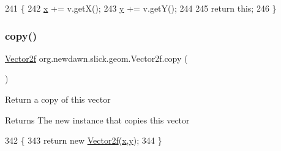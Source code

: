 \begin{DoxyCode}
241     \{
242         \mbox{\hyperlink{classorg_1_1newdawn_1_1slick_1_1geom_1_1_vector2f_a3c72cdf13ebc511a472e1a02002fa579}{x}} += v.getX(); 
243         \mbox{\hyperlink{classorg_1_1newdawn_1_1slick_1_1geom_1_1_vector2f_aa03914f0c3d32063aa90e5bd7b74688e}{y}} += v.getY();
244         
245         \textcolor{keywordflow}{return} \textcolor{keyword}{this};
246     \}
\end{DoxyCode}
\mbox{\label{classorg_1_1newdawn_1_1slick_1_1geom_1_1_vector2f_a3f38eacefe225aef76d800a07267db32}} 
\subsubsection{\texorpdfstring{copy()}{copy()}}
{\footnotesize\ttfamily \mbox{\hyperlink{classorg_1_1newdawn_1_1slick_1_1geom_1_1_vector2f}{Vector2f}} org.\+newdawn.\+slick.\+geom.\+Vector2f.\+copy (\begin{DoxyParamCaption}{ }\end{DoxyParamCaption})\hspace{0.3cm}{\ttfamily [inline]}}

Return a copy of this vector

\begin{DoxyReturn}{Returns}
The new instance that copies this vector 
\end{DoxyReturn}

\begin{DoxyCode}
342                            \{
343         \textcolor{keywordflow}{return} \textcolor{keyword}{new} \mbox{\hyperlink{classorg_1_1newdawn_1_1slick_1_1geom_1_1_vector2f_a3b8e9eda9c9203462324bf4bc8e42153}{Vector2f}}(\mbox{\hyperlink{classorg_1_1newdawn_1_1slick_1_1geom_1_1_vector2f_a3c72cdf13ebc511a472e1a02002fa579}{x}},\mbox{\hyperlink{classorg_1_1newdawn_1_1slick_1_1geom_1_1_vector2f_aa03914f0c3d32063aa90e5bd7b74688e}{y}});
344     \}
\end{DoxyCode}
\mbox{\label{classorg_1_1newdawn_1_1slick_1_1geom_1_1_vector2f_a0c78cd993e1ccefe024b695381fabb5c}} 
